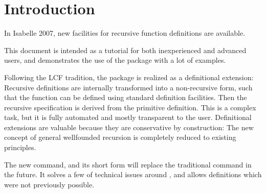 \section{Introduction}

In Isabelle 2007, new facilities for recursive function definitions
are available.

This document is intended as a tutorial for both inexperienced and
advanced users, and demonstrates the use of the package with a lot of
examples.


Following the LCF tradition, the package is realized as a definitional
extension: Recursive definitions are internally transformed into a
non-recursive form, such that the function can be defined using
standard definition facilities. Then the recursive specification is
derived from the primitive definition.  This is a complex task, but it
is fully automated and mostly transparent to the user. Definitional
extensions are valuable because they are conservative by construction:
The new concept of general wellfounded recursion is completely reduced
to existing principles.




The new  command, and its short form  will
replace the traditional  command in the future. It solves
a few of technical issues around , and allows definitions
which were not previously possible.



